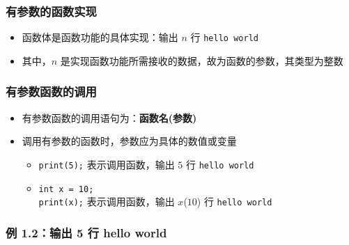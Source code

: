 \begin{frame}[fragile]
    \frametitle{有参数的函数实现}

    \begin{itemize}[<+->]
        \item 函数体是函数功能的具体实现：输出 $n$ 行 \lstinline|hello world|
        \item 其中，$n$ 是实现函数功能所需接收的数据，故为函数的参数，其类型为整数

        
    \end{itemize}
\end{frame}

\begin{frame}[fragile]
    \frametitle{有参数函数的调用}

    \begin{itemize}[<+->]
        \item 有参数函数的调用语句为：\textbf{函数名(参数)}
        \item 调用有参数的函数时，参数应为具体的数值或变量
        \begin{itemize}
            \item \lstinline|print(5);| 表示调用函数，输出 $5$ 行 \lstinline|hello world|
            \item \lstinline|int x = 10;|\\
                  \lstinline|print(x);| 表示调用函数，输出 $x$($10$) 行 \lstinline|hello world|
        \end{itemize}
    \end{itemize}
\end{frame}

\begin{frame}[fragile]
    \frametitle{例 1.2：输出 5 行 hello world}
    
    
\end{frame}

